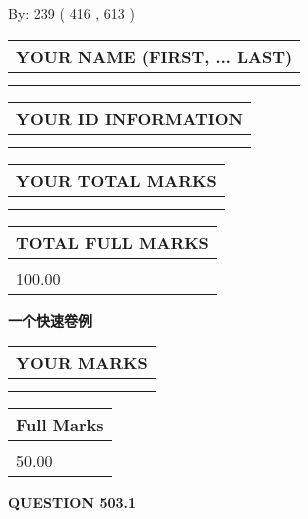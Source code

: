 \documentclass{ctexart}
\begin{document}
   
\hspace{1.0in} By: 
 239 ( 416 ,  613 )
   
   
   
   
\newpage 
\setcounter{page}{ 
   503001 } 
   
   
   
   
\noindent\begin{tabular}{|l|}
\hline
YOUR NAME (FIRST, ... LAST)  \\
\hline
 \\ 
 \\ 
\hline
\end{tabular}
\hspace{0.05in} \begin{tabular}{|l|}
\hline
 YOUR   ID   INFORMATION  \\
\hline
 \\ 
 \\ 
\hline
\end{tabular}
   
   
\vspace{0.2in}\noindent\begin{tabular}{|l|}
\hline
YOUR TOTAL MARKS  \\
\hline
 \\ 
 \\ 
\hline
\end{tabular}
\hspace{0.05in} \begin{tabular}{|l|}
\hline
TOTAL FULL MARKS  \\
\hline
 \\ 
100.00 \\
\hline
\end{tabular}
   
   
 \vspace{0.2in}
{\LARGE {\textbf{ 一个快速卷例}}}
   
   
  
\vspace{0.2in}
  
\noindent\begin{tabular}{|l|}
\hline
 YOUR MARKS  \\
\hline
 \\ 
 \\ 
\hline
\end{tabular}
\hspace{0.05in} \begin{tabular}{|l|}
\hline
 Full Marks  \\
\hline
 \\ 
50.00 \\
\hline
\end{tabular}
{\textbf{\Large{QUESTION
503.1 
}}}
  
\end{document}
